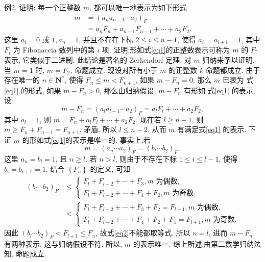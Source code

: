 例2. 证明: 每一个正整数 $m$, 都可以唯一地表示为如下形式
$$
\begin{aligned}
m & =\left(a_n a_{n-1} \cdots a_2\right)_F \\
& =a_n F_n+a_{n-1} F_{n-1}+\cdots+a_2 F_2 . 
\end{aligned} \label{eq1}
$$
这里 $a_i=0$ 或 $1, a_n=1$, 并且不存在下标 $2 \leqslant i \leqslant n-1$, 使得 $a_i=a_{i+1}=1$, 其中 $F_i$ 为 Fibonaccia 数列中的第 $i$ 项.
证明:形如式\ref{eq1}的正整数表示可称为 $m$ 的 $F$-表示, 它类似于二进制, 此结论是著名的 Zerkendorf 定理.
对 $m$ 归纳来予以证明.
当 $m=1$ 时, $m=F_2$, 命题成立.
现设对所有小于 $m$ 的正整数 $k$ 命题都成立.
由于存在唯一的 $n \in \mathbf{N}^*$, 使得 $F_n \leqslant m<F_{n+1}$, 如果 $m-F_n=0$, 那么 $m$ 已表为 式\ref{eq1} 的形式, 如果 $m-F_n>0$, 那么由归纳假设, $m-F_n$ 有形如 式\ref{eq1} 的表示, 设
$$
m-F_n=\left(a_l a_{l-1} \cdots a_2\right)_F=a_l F_l+\cdots+a_2 F_2,
$$
其中 $a_l=1$, 则 $m=F_n+a_l F_l+\cdots+a_2 F_2$. 现在若 $l \geqslant n-1$, 则 $m \geqslant F_n+ F_{n-1}=F_{n+1}$, 矛盾, 所以 $l \leqslant n-2$, 从而 $m$ 有满足式\ref{eq1} 的表示.
下证 $m$ 的形如式\ref{eq1}的表示是唯一的.
事实上,若
$$
m=\left(a_n \cdots a_2\right)_F=\left(b_l \cdots b_2\right)_F, \label{eq2}
$$
这里 $a_n=b_l=1$, 且 $n \geqslant l$.
若 $n>l$, 则由于不存在下标 $1 \leqslant i \leqslant l-1$, 使得 $b_i=b_{i+1}=1$, 结合 $\left\{F_n\right\}$ 的定义, 可知
$$
\begin{aligned}
\left(b_l \cdots b_2\right)_F & \leqslant\left\{\begin{array}{l}
F_l+F_{l-2}+\cdots+F_3, m \text { 为偶数, } \\
F_l+F_{l-2}+\cdots+F_4+F_2, m \text { 为奇数, }
\end{array}\right. \\
& <\left\{\begin{array}{l}
F_l+F_{l-2}+\cdots+F_3+F_2=F_{l+1}, m \text { 为偶数, } \\
F_l+F_{l-2}+\cdots+F_4+F_2+F_1=F_{l+1}, m \text { 为奇数.
}
\end{array}\right.
\end{aligned}
$$
因此 $\left(b_l \cdots b_2\right)_F<F_{l+1} \leqslant F_n$, 故式\ref{eq2}不能都取等式.
所以 $n=l$, 进而 $m-F_n$ 有两种表示, 这与归纳假设不符.
所以, $m$ 的表示唯一.
综上所述,由第二数学归纳法知, 命题成立.



